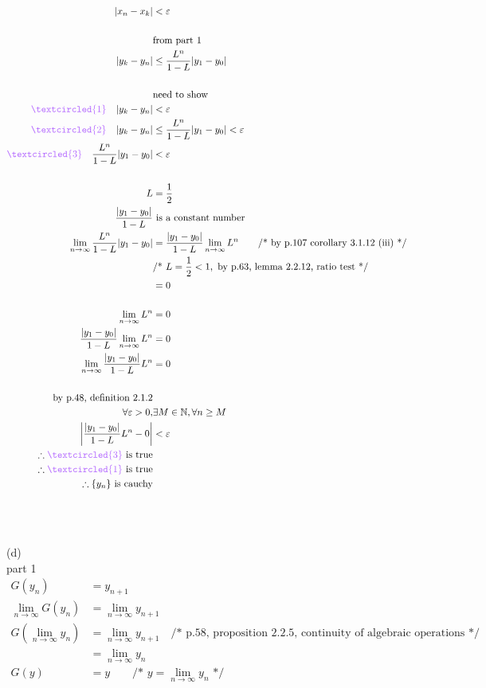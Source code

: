 \documentclass[12pt, border = 4pt, multi]{article} %
\begin{document}
\begin{align*}
|x_n - x_k| &< \varepsilon\\
\\
&\text{from part 1}\\
|y_k - y_n| &\leq \frac{L ^ n}{1 - L}|y_1 - y_0|\\
\\
&\text{need to show}\\
\textcolor{orchid}{\textcircled{1}}\quad|y_k - y_n| &< \varepsilon\\
\textcolor{orchid}{\textcircled{2}}\quad|y_k - y_n| &\leq \frac{L ^ n}{1 - L}|y_1 - y_0| < \varepsilon\\
\textcolor{orchid}{\textcircled{3}}\quad\frac{L ^ n}{1 - L}|y_1 - y_0| &< \varepsilon\\
\\
L &= \frac{1}{2}\\
\frac{|y_1 - y_0|}{1 - L} &\text{ is a constant number}\\
\lim_{n \rightarrow \infty} \frac{L ^ n}{1 - L}|y_1 - y_0| &= \frac{|y_1 - y_0|}{1 - L}\lim_{n \rightarrow \infty} L ^ n \qquad \text{/* by p.107 corollary 3.1.12 (iii) */}\\
&\text{/* } L = \frac{1}{2} < 1, \text{ by p.63, lemma 2.2.12, ratio test */}\\
&= 0\\
\\
\lim_{n \rightarrow \infty} L ^ n &= 0\\
\frac{|y_1 - y_0|}{1 - L}\lim_{n \rightarrow \infty} L ^ n &= 0\\
\lim_{n \rightarrow \infty} \frac{|y_1 - y_0|}{1 - L} L ^ n &= 0\\
\\
\text{by p.48, definition 2.1.2}\\
\forall \varepsilon > 0, &\exists M \in \mathbb{N}, \forall n \geq M\\
\left|\frac{|y_1 - y_0|}{1 - L} L ^ n - 0\right| &< \varepsilon\\
\therefore \textcolor{orchid}{\textcircled{3}} \text{ is true}\\
\therefore \textcolor{orchid}{\textcircled{1}} \text{ is true}\\
\therefore \{y_n\}\text{ is cauchy}
\end{align*}
\\
\\
\\
(d)\\
part 1
\begin{align*} 
G(y_n) &= y_{n + 1}\\
\lim_{n \rightarrow \infty} G(y_n) &= \lim_{n \rightarrow \infty} y_{n + 1}\\
G(\lim_{n \rightarrow \infty} y_n) &= \lim_{n \rightarrow \infty} y_{n + 1}\quad \text{/* p.58, proposition 2.2.5, continuity of algebraic operations */}\\
&= \lim_{n \rightarrow \infty} y_n\\
G(y) &= y \qquad \text{/* } y = \lim_{n \rightarrow \infty} y_n \text{ */}
\end{align*}
\end{document}
